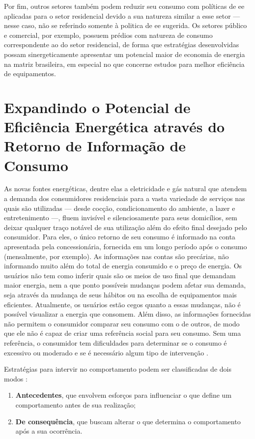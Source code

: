 Por fim, outros setores também podem reduzir seu consumo com políticas de
\gls{ee} aplicadas para o setor residencial devido a sua natureza similar a esse
setor --- nesse caso, não se referindo somente à politica de \gls{ee} sugerida. 
Os setores público e comercial, por exemplo, possuem prédios com natureza
de consumo correspondente ao do setor residencial, de forma que estratégias 
desenvolvidas possam sinergeticamente apresentar um potencial maior de 
economia de energia na matriz brasileira, em especial no que concerne estudos
para melhor eficiência de equipamentos.

\section{Expandindo o Potencial de Eficiência Energética através do Retorno de
Informação de Consumo}
\label{sec:ee_res_exp}

As novas fontes energéticas, dentre elas a eletricidade e gás natural
que atendem a demanda dos consumidores residenciais para a vasta 
variedade de serviços nas quais são utilizadas 
--- desde cocção, condicionamento do ambiente, a lazer e 
entretenimento ---, fluem invisível e silenciosamente para seus domicílios, sem
deixar qualquer traço notável de sua utilização além do efeito final desejado pelo
consumidor. Para eles, o único retorno de seu consumo é informado na conta
apresentada pela concessionária, fornecida em um longo período após o consumo
(mensalmente, por exemplo). As informações nas contas são precárias, não informando 
muito além do total de energia consumido e o preço de energia. 
Os usuários não tem como inferir quais são os meios de uso final que demandam 
maior energia, nem a que ponto possíveis mudanças podem afetar sua demanda, 
seja através da mudança de seus hábitos ou na escolha 
de equipamentos mais eficientes. Atualmente, os usuários estão cegos quanto a essas
mudanças, não é possível visualizar a energia que consomem. Além disso, as
informações fornecidas não permitem o consumidor comparar seu consumo com o de
outros, de modo que ele não é capaz de criar uma referência social para seu consumo.
Sem uma referência, o consumidor tem dificuldades para determinar se o consumo é
excessivo ou moderado e se é necessário algum tipo de intervenção 
\cite{aceee_2010_estudos_feedback}.

Estratégias para intervir no comportamento podem ser classificadas de dois modos
\cite{aceee_2010_estudos_feedback,2009_epri}:
\begin{enumerate}
\item \textbf{Antecedentes}, que envolvem esforços para influenciar o que define 
um comportamento antes de sua realização; 
\item \textbf{De consequência}, que buscam alterar o que determina o 
comportamento após a sua ocorrência. 
\end{enumerate}

